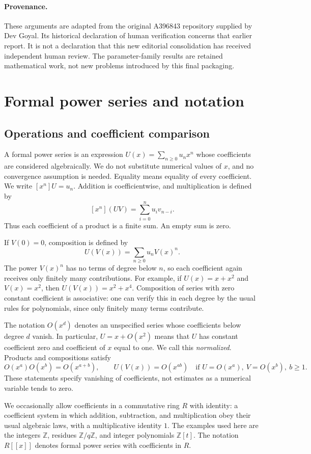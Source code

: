 \documentclass[11pt,a4paper]{article}
\theoremstyle{remark}\newtheorem{remark}[theorem]{Remark}
\newcommand{\Z}{\mathbb Z}
\begin{document}
\paragraph{Provenance.}
These arguments are adapted from the original A396843 repository supplied
by Dev Goyal. Its historical declaration of human verification concerns
that earlier report. It is not a declaration that this new editorial
consolidation has received independent human review.
The parameter-family results are retained mathematical work, not new
problems introduced by this final packaging.
\section{Formal power series and notation}\label{sec:prelim}

\subsection{Operations and coefficient comparison}

A formal power series is an expression
$U(x)=\sum_{n\ge0}u_nx^n$ whose coefficients are considered algebraically.
We do not substitute numerical values of $x$, and no convergence assumption
is needed. Equality means equality of every coefficient. We write
$[x^n]U=u_n$. Addition is coefficientwise, and multiplication is defined by
\[
 [x^n](UV)=\sum_{i=0}^{n}u_i v_{n-i}.
\]
Thus each coefficient of a product is a finite sum. An empty sum is zero.

If $V(0)=0$, composition is defined by
\[
 U(V(x))=\sum_{n\ge0}u_n V(x)^n.
\]
The power $V(x)^n$ has no terms of degree below $n$, so each coefficient
again receives only finitely many contributions. For example, if
$U(x)=x+x^2$ and $V(x)=x^2$, then $U(V(x))=x^2+x^4$.
Composition of series with zero constant coefficient is associative:
one can verify this in each degree by the usual rules for polynomials,
since only finitely many terms contribute.

The notation $O(x^d)$ denotes an unspecified series whose coefficients below
degree $d$ vanish. In particular, $U=x+O(x^2)$ means that $U$ has constant
coefficient zero and coefficient of $x$ equal to one. We call this
\emph{normalized}. Products and compositions satisfy
\[
 O(x^a)O(x^b)=O(x^{a+b}),\qquad
 U(V(x))=O(x^{ab})
 \quad\text{if }U=O(x^a),\ V=O(x^b),\ b\ge1.
\]
These statements specify vanishing of coefficients, not estimates as a
numerical variable tends to zero.

We occasionally allow coefficients in a commutative ring $R$ with identity:
a coefficient system in which addition, subtraction, and multiplication
obey their usual algebraic laws, with a multiplicative identity $1$.
The examples used here are the integers $\Z$, residues $\Z/q\Z$, and
integer polynomials $\Z[t]$. The notation $R[[x]]$ denotes formal power
series with coefficients in $R$.
\end{document}
